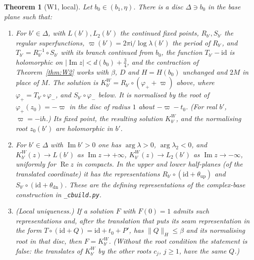 \documentclass[11pt]{amsart}
\newtheorem{theorem}{Theorem}[section]
\theoremstyle{definition}
\newcommand{\Rr}{R}
\newcommand{\Kk}{K}
\newcommand{\ii}{\mathrm{i}}
\begin{document}
\begin{theorem}[W1, local]\label{thm:W1}
Let $b_0\in(b_1,\eta)$.  There is a disc $\Delta\ni b_0$ in the base plane such
that:
\begin{enumerate}
\item For $b'\in\Delta$, with $L(b'),L_2(b')$ the continued fixed points,
  $\Rr_{b'},S_{b'}$ the regular superfunctions, $\varpi(b')=2\pi\ii/\log\lambda(b')$
  the period of $\Rr_{b'}$, and $T_{b'}=\Rr_{b'}^{-1}\circ S_{b'}$ with its branch
  continued from $b_0$, the function $T_{b'}-\mathrm{id}$ is holomorphic on
  $|\operatorname{Im}z|<d(b_0)+\tfrac34$, and the contraction of
  Theorem~\ref{thm:W2} works with $\beta$, $D$ and $H=H(b_0)$ unchanged and $2M$
  in place of $M$.  The solution is
  $\Kk^W_{b'}=\Rr_{b'}\circ(\varphi_++\varpi)$ above, where
  $\varphi_+=T_{b'}\circ\varphi_-$, and $S_{b'}\circ\varphi_-$ below.  It is
  normalised by the root of $\varphi_+(z_0)=-\varpi$ in the disc of radius $1$
  about $-\varpi-t_0$.  (For real $b'$, $\varpi=-\ii h$.)
  Its fixed point, the resulting solution $\Kk^W_{b'}$, and the normalising root
  $z_0(b')$ are holomorphic in $b'$.
\item For $b'\in\Delta$ with $\operatorname{Im}b'>0$ one has $\arg\lambda>0$,
  $\arg\lambda_2<0$, and $\Kk^W_{b'}(z)\to L(b')$ as $\operatorname{Im}z\to+\infty$,
  $\Kk^W_{b'}(z)\to L_2(b')$ as $\operatorname{Im}z\to-\infty$, uniformly for
  $\operatorname{Re}z$ in compacts.  In the upper and lower half-planes (of
  the translated coordinate) it has the representations
  $\Rr_{b'}\circ(\mathrm{id}+\theta_{\mathrm{up}})$ and
  $S_{b'}\circ(\mathrm{id}+\theta_{\mathrm{dn}})$.  These are the defining
  representations of the complex-base construction in \texttt{\_cbuild.py}.
\item (Local uniqueness.)  If a solution $F$ with $F(0)=1$ admits such
  representations and, after the translation that puts its seam
  representation in the form $T\circ(\mathrm{id}+Q)=\mathrm{id}+t_0+P'$, has
  $\|Q\|_H\le\beta$ and its normalising root in that disc, then
  $F=\Kk^W_{b'}$.  (Without the root condition the statement is false: the
  translates of $\Kk^W_{b'}$ by the other roots $c_j$, $j\ge1$, have the same $Q$.)
\end{enumerate}
\end{theorem}
\end{document}

